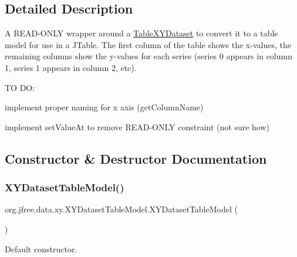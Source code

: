 \subsection{Detailed Description}
A R\+E\+A\+D-\/\+O\+N\+LY wrapper around a \mbox{\hyperlink{interfaceorg_1_1jfree_1_1data_1_1xy_1_1_table_x_y_dataset}{Table\+X\+Y\+Dataset}} to convert it to a table model for use in a J\+Table. The first column of the table shows the x-\/values, the remaining columns show the y-\/values for each series (series 0 appears in column 1, series 1 appears in column 2, etc). 

TO DO\+: 
\begin{DoxyItemize}
\item implement proper naming for x axis (get\+Column\+Name) 
\item implement set\+Value\+At to remove R\+E\+A\+D-\/\+O\+N\+LY constraint (not sure how) 
\end{DoxyItemize}

\subsection{Constructor \& Destructor Documentation}
\mbox{\label{classorg_1_1jfree_1_1data_1_1xy_1_1_x_y_dataset_table_model_ad4cf8e46809aa1ea976e948c69232505}} 
\subsubsection{\texorpdfstring{X\+Y\+Dataset\+Table\+Model()}{XYDatasetTableModel()}\hspace{0.1cm}{\footnotesize\ttfamily [1/2]}}
{\footnotesize\ttfamily org.\+jfree.\+data.\+xy.\+X\+Y\+Dataset\+Table\+Model.\+X\+Y\+Dataset\+Table\+Model (\begin{DoxyParamCaption}{ }\end{DoxyParamCaption})}

Default constructor. \mbox{\label{classorg_1_1jfree_1_1data_1_1xy_1_1_x_y_dataset_table_model_a87989efebad6c02284ed190e6cdc47a6}} 
